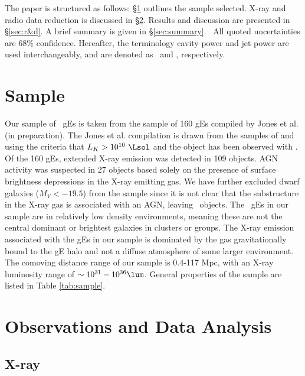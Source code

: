 \documentclass{emulateapj}
\begin{document}
The paper is structured as follows: \S\ref{sec:sample} outlines the
sample selected. X-ray and radio data reduction is discussed in
\S\ref{sec:data}. Results and discussion are presented in
\S\ref{sec:r&d}. A brief summary is given in
\S\ref{sec:summary}. \LCDM\ All quoted uncertainties are 68\%
confidence. Hereafter, the terminology cavity power and jet power are
used interchangeably, and are denoted as \pcav\ and \pjet,
respectively.

\section{Sample}
\label{sec:sample}

Our sample of \samp\ gEs is taken from the sample of 160 gEs compiled
by Jones et al. (in preparation). The Jones et al. compilation is
drawn from the samples of \citet{1999MNRAS.302..209B} and
\citet{2003MNRAS.340.1375O} using the criteria that $L_K >
10^{10}~\Lsol$ and the object has been observed with \chandra. Of the
160 gEs, extended X-ray emission was detected in 109 objects. AGN
activity was suspected in 27 objects based solely on the presence of
surface brightness depressions in the X-ray emitting gas. We have
further excluded dwarf galaxies ($M_V < -19.5$) from the sample since
it is not clear that the substructure in the X-ray gas is associated
with an AGN, leaving \samp\ objects. The \samp\ gEs in our sample are
in relatively low density environments, meaning these are not the
central dominant or brightest galaxies in clusters or groups. The
X-ray emission associated with the gEs in our sample is dominated by
the gas gravitationally bound to the gE halo and not a diffuse
atmosphere of some larger environment. The comoving distance range of
our sample is 0.4-117 Mpc, with an X-ray luminosity range of $\sim
10^{31}-10^{36} \lum$. General properties of the sample are listed in
Table \ref{tab:sample}.



\section{Observations and Data Analysis}
\label{sec:data}

\subsection{X-ray}
\label{sec:xray}
\end{document}
